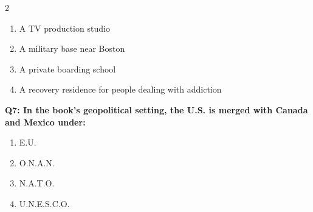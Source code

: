 \documentclass[10pt]{article}
\begin{document}
\begin{multicols}{2}
\begin{enumerate}[label=\arabic*.]
\item A TV production studio
\item A military base near Boston
\item A private boarding school
\item A recovery residence for people dealing with addiction
\end{enumerate}
\textbf{Q7: In the book's geopolitical setting, the U.S. is merged with Canada and Mexico under:}

\begin{enumerate}[label=\arabic*.]
\item E.U.
\item O.N.A.N.
\item N.A.T.O.
\item U.N.E.S.C.O.
\end{enumerate}
\end{multicols}
\end{document}
